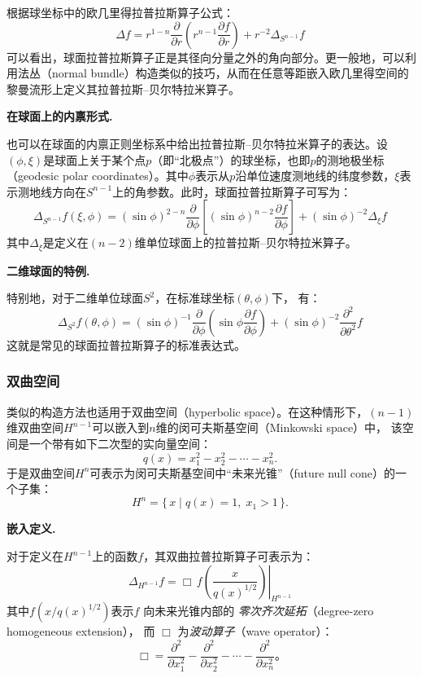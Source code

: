 根据球坐标中的欧几里得拉普拉斯算子公式：
\[
\Delta f
= r^{1-n} \frac{\partial}{\partial r}
\left( r^{n-1} \frac{\partial f}{\partial r} \right)
+ r^{-2} \Delta_{S^{n-1}} f~
\]
可以看出，球面拉普拉斯算子正是其径向分量之外的角向部分。更一般地，可以利用法丛（normal bundle）构造类似的技巧，从而在任意等距嵌入欧几里得空间的黎曼流形上定义其拉普拉斯–贝尔特拉米算子。

\textbf{在球面上的内禀形式.}

也可以在球面的内禀正则坐标系中给出拉普拉斯–贝尔特拉米算子的表达。设$(\phi, \xi)$是球面上关于某个点$p$（即“北极点”）的球坐标，也即$p$的测地极坐标（geodesic polar coordinates）。其中$\phi$表示从$p$沿单位速度测地线的纬度参数，$\xi$表示测地线方向在$S^{n-1}$上的角参数。此时，球面拉普拉斯算子可写为：
\[
\Delta_{S^{n-1}} f(\xi, \phi)
= (\sin \phi)^{2-n}
\frac{\partial}{\partial \phi}
\left[ (\sin \phi)^{n-2} \frac{\partial f}{\partial \phi} \right]
+ (\sin \phi)^{-2} \Delta_{\xi} f~
\]
其中$\Delta_{\xi}$是定义在$(n-2)$维单位球面上的拉普拉斯–贝尔特拉米算子。

\textbf{二维球面的特例.}

特别地，对于二维单位球面$S^{2}$，在标准球坐标$(\theta, \phi)$下，
有：
\[
\Delta_{S^{2}} f(\theta, \phi)
= (\sin \phi)^{-1}
\frac{\partial}{\partial \phi}
\left( \sin \phi \frac{\partial f}{\partial \phi} \right)
+ (\sin \phi)^{-2}
\frac{\partial^{2}}{\partial \theta^{2}}f~
\]
这就是常见的球面拉普拉斯算子的标准表达式。
\subsubsection{双曲空间}
类似的构造方法也适用于双曲空间（hyperbolic space）。在这种情形下，$(n-1)$ 维双曲空间$H^{n-1}$可以嵌入到$n$维的闵可夫斯基空间（Minkowski space）中，
该空间是一个带有如下二次型的实向量空间：
\[
q(x) = x_{1}^{2} - x_{2}^{2} - \cdots - x_{n}^{2}.~
\]
于是双曲空间$H^{n}$可表示为闵可夫斯基空间中“未来光锥”（future null cone）的一个子集：
\[
H^{n} = \{\, x \mid q(x) = 1,\; x_{1} > 1 \,\}.~
\]

\textbf{嵌入定义.}

对于定义在$H^{n-1}$上的函数$f$，其双曲拉普拉斯算子可表示为：
\[
\Delta_{H^{n-1}} f
= \left. \Box\, f\!\left( \frac{x}{q(x)^{1/2}} \right) \right|_{H^{n-1}}~
\]
其中$f\!\left( x / q(x)^{1/2} \right)$表示$f$ 向未来光锥内部的
\emph{零次齐次延拓}（degree-zero homogeneous extension），
而 $\Box$ 为\emph{波动算子}（wave operator）：
\[
\Box
= \frac{\partial^{2}}{\partial x_{1}^{2}}
 - \frac{\partial^{2}}{\partial x_{2}^{2}}
 - \cdots
 - \frac{\partial^{2}}{\partial x_{n}^{2}}。
\]

